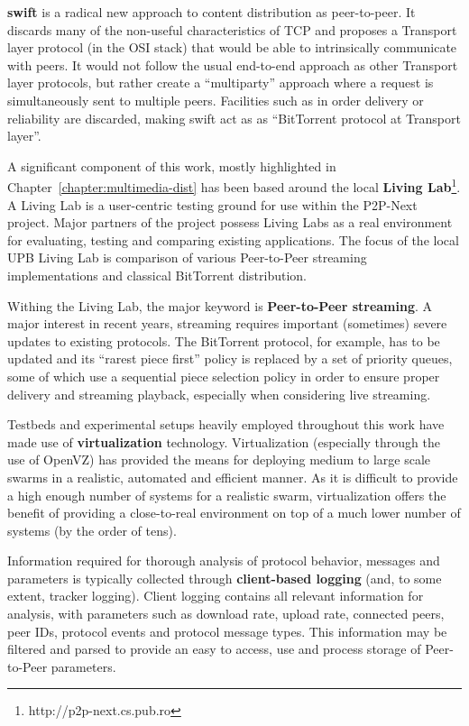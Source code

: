 \textbf{swift} is a radical new approach to content distribution as
peer-to-peer. It discards many of the non-useful characteristics of TCP and
proposes a Transport layer protocol (in the OSI stack) that would be able to
intrinsically communicate with peers. It would not follow the usual end-to-end
approach as other Transport layer protocols, but rather create a
``multiparty'' approach where a request is simultaneously sent to multiple
peers. Facilities such as in order delivery or reliability are discarded,
making swift act as as ``BitTorrent protocol at Transport layer''.

A significant component of this work, mostly highlighted in
Chapter~\ref{chapter:multimedia-dist} has been based around the local
\textbf{Living Lab}\footnote{http://p2p-next.cs.pub.ro}. A Living Lab is a
user-centric testing ground for use within the P2P-Next project. Major
partners of the project possess Living Labs as a real environment for
evaluating, testing and comparing existing applications. The focus of the
local UPB Living Lab is comparison of various Peer-to-Peer streaming
implementations and classical BitTorrent distribution.

Withing the Living Lab, the major keyword is \textbf{Peer-to-Peer streaming}.
A major interest in recent years, streaming requires important (sometimes)
severe updates to existing protocols. The BitTorrent protocol, for example,
has to be updated and its ``rarest piece first'' policy is replaced by a set
of priority queues, some of which use a sequential piece selection policy in
order to ensure proper delivery and streaming playback, especially when
considering live streaming.

Testbeds and experimental setups heavily employed throughout this work have
made use of \textbf{virtualization} technology. Virtualization (especially
through the use of OpenVZ) has provided the means for deploying medium to
large scale swarms in a realistic, automated and efficient manner. As it is
difficult to provide a high enough number of systems for a realistic swarm,
virtualization offers the benefit of providing a close-to-real environment
on top of a much lower number of systems (by the order of tens).

Information required for thorough analysis of protocol behavior, messages and
parameters is typically collected through \textbf{client-based logging} (and,
to some extent, tracker logging). Client logging contains all relevant
information for analysis, with parameters such as download rate, upload rate,
connected peers, peer IDs, protocol events and protocol message types. This
information may be filtered and parsed to provide an easy to access, use and
process storage of Peer-to-Peer parameters.

